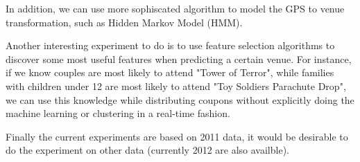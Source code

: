 \documentclass[12pt]{article}
\begin{document}
In addition, we can use more sophiscated algorithm to model the GPS to venue transformation, such as Hidden Markov Model (HMM).

Another interesting experiment to do is to use feature selection algorithms to discover some most useful features when predicting a certain venue. For instance, if we know couples are most likely to attend "Tower of Terror", while families with children under 12 are most likely to attend "Toy Soldiers Parachute Drop", we can use this knowledge while distributing coupons without explicitly doing the machine learning or clustering in a real-time fashion.

Finally the current experiments are based on 2011 data, it would be desirable to do the experiment on other data (currently 2012 are also availble). 



\end{document}

